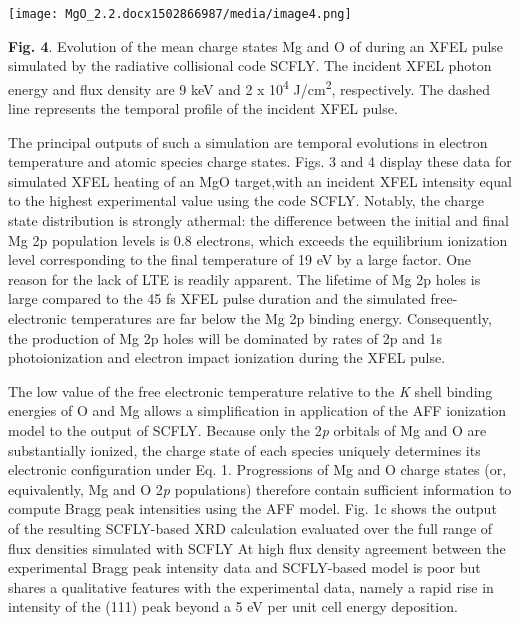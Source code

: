 \begin{center}
\texttt{[image: MgO\_2.2.docx1502866987/media/image4.png]}
\end{center}

\textbf{Fig. 4}. Evolution of the mean charge states Mg and O of during
an XFEL pulse simulated by the radiative collisional code SCFLY. The
incident XFEL photon energy and flux density are 9 keV and 2 x
10\textsuperscript{4} J/cm\textsuperscript{2}, respectively. The dashed
line represents the temporal profile of the incident XFEL pulse.

The principal outputs of such a simulation are temporal evolutions in
electron temperature and atomic species charge states. Figs. 3 and 4
display these data for simulated XFEL heating of an MgO target,with an
incident XFEL intensity equal to the highest experimental value using
the code SCFLY. Notably, the charge state distribution is strongly
athermal: the difference between the initial and final Mg 2p population
levels is 0.8 electrons, which exceeds the equilibrium ionization level
corresponding to the final temperature of 19 eV by a large factor. One
reason for the lack of LTE is readily apparent. The lifetime of Mg 2p
holes is large compared to the 45 fs XFEL pulse duration \cite{KESKI1974TOTAL, FUGGLE1992UNOCCUPIED} and
the simulated free-electronic temperatures are far below the Mg 2p
binding energy. Consequently, the production of Mg 2p holes will be
dominated by rates of 2p and 1s photoionization and electron impact
ionization during the XFEL pulse.

\FloatBarrier

The low value of the free electronic temperature relative to the
\emph{K} shell binding energies of O and Mg allows a simplification in
application of the AFF ionization model to the output of SCFLY. Because
only the 2\emph{p} orbitals of Mg and O are substantially ionized, the
charge state of each species uniquely determines its electronic
configuration under Eq. 1. Progressions of Mg and O charge states (or,
equivalently, Mg and O 2\emph{p} populations) therefore contain
sufficient information to compute Bragg peak intensities using the AFF
model. Fig. 1c shows the output of the resulting SCFLY-based XRD
calculation evaluated over the full range of flux densities simulated
with SCFLY At high flux density agreement between the experimental Bragg
peak intensity data and SCFLY-based model is poor but shares a
qualitative features with the experimental data, namely a rapid rise in
intensity of the (111) peak beyond a 5 eV per unit cell energy
deposition.

